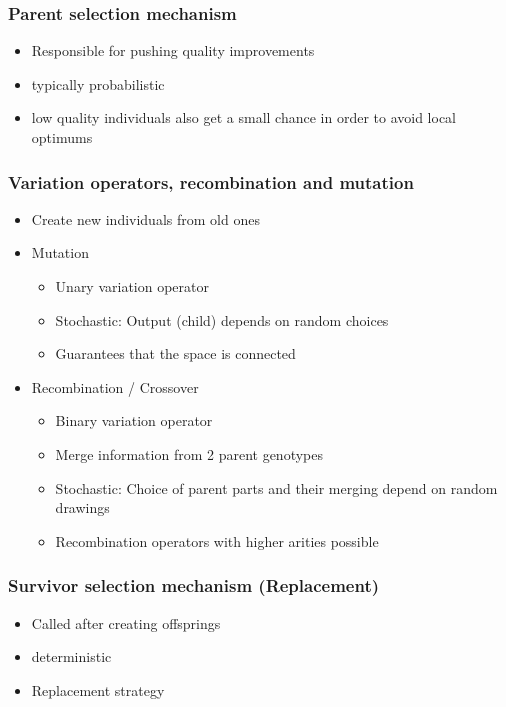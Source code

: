     \subsubsection{Parent selection mechanism}
        \begin{itemize}
            \item Responsible for pushing quality improvements
            \item typically probabilistic
            \item low quality individuals also get a small chance in order to avoid local optimums
        \end{itemize}
    \subsubsection{Variation operators, recombination and mutation}
        \begin{itemize}
            \item Create new individuals from old ones
            \item Mutation
            \begin{itemize}
                \item Unary variation operator
                \item Stochastic: Output (child) depends on random choices
                \item Guarantees that the space is connected
            \end{itemize}
            \item Recombination / Crossover
            \begin{itemize}
                \item Binary variation operator
                \item Merge information from 2 parent genotypes
                \item Stochastic: Choice of parent parts and their merging depend on random drawings
                \item Recombination operators with higher arities possible
            \end{itemize}
        \end{itemize}
    \subsubsection{Survivor selection mechanism (Replacement)}
        \begin{itemize}
            \item Called after creating offsprings
            \item deterministic
            \item Replacement strategy
        \end{itemize}
